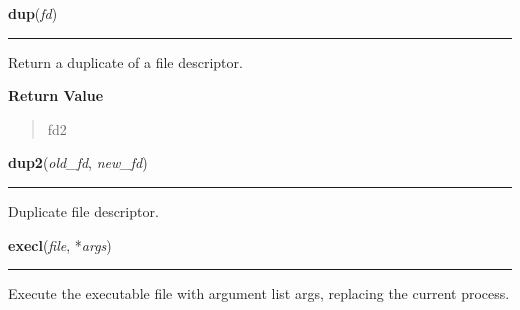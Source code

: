     \label{os:dup}

    \vspace{0.5ex}

\hspace{.8\funcindent}\begin{boxedminipage}{\funcwidth}

    \raggedright \textbf{dup}(\textit{fd})

    \vspace{-1.5ex}

    \rule{\textwidth}{0.5\fboxrule}
\setlength{\parskip}{2ex}
    Return a duplicate of a file descriptor.

\setlength{\parskip}{1ex}
      \textbf{Return Value}
    \vspace{-1ex}

      \begin{quote}
      fd2

      \end{quote}

    \end{boxedminipage}

    \label{os:dup2}

    \vspace{0.5ex}

\hspace{.8\funcindent}\begin{boxedminipage}{\funcwidth}

    \raggedright \textbf{dup2}(\textit{old\_fd}, \textit{new\_fd})

    \vspace{-1.5ex}

    \rule{\textwidth}{0.5\fboxrule}
\setlength{\parskip}{2ex}
    Duplicate file descriptor.

\setlength{\parskip}{1ex}
    \end{boxedminipage}

    \label{os:execl}

    \vspace{0.5ex}

\hspace{.8\funcindent}\begin{boxedminipage}{\funcwidth}

    \raggedright \textbf{execl}(\textit{file}, *\textit{args})

    \vspace{-1.5ex}

    \rule{\textwidth}{0.5\fboxrule}
\setlength{\parskip}{2ex}
    Execute the executable file with argument list args, replacing the 
    current process.

\setlength{\parskip}{1ex}
    \end{boxedminipage}

